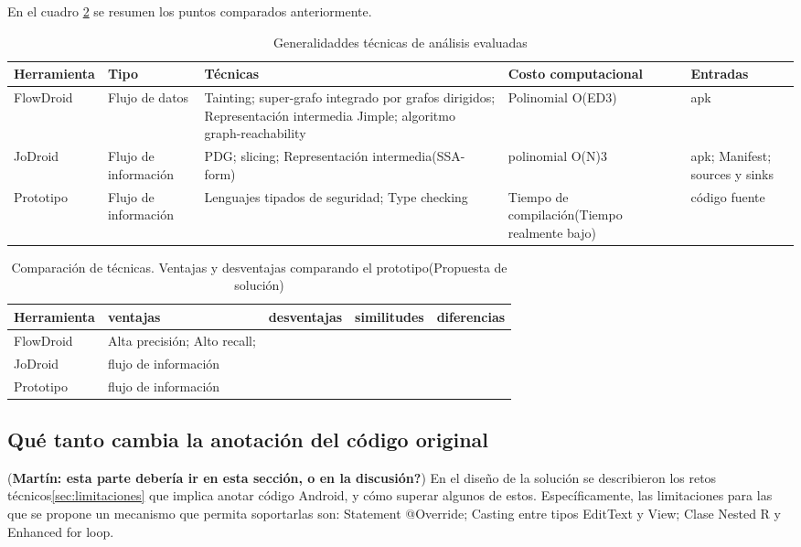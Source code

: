 En el cuadro \ref{tab:comparacion} se resumen los puntos comparados
anteriormente.
\begin{table}[H]
\begin{center}
\small\addtolength{\tabcolsep}{-3pt}
\begin{tabular}{|p{}|p{}|p{5cm}|p{2cm}|p{2cm}|}
	\hline
	\textbf{Herramienta} & \textbf{Tipo} & \textbf{Técnicas} & \textbf{Costo
	computacional} & \textbf{ Entradas} \\
	\hline
	FlowDroid & Flujo de datos & 
	Tainting; super-grafo integrado por grafos dirigidos; Representación intermedia
	Jimple; algoritmo graph-reachability & Polinomial
	O(ED3)\cite{Graph-reachability} & apk\\
	\hline
	JoDroid & Flujo de información & PDG; slicing; Representación intermedia(SSA-
	form) & polinomial O(N)3\cite{FCO-PDG} & apk; Manifest; sources y sinks
	\\
	\hline
	Prototipo & Flujo de información  & Lenguajes tipados de seguridad; Type
	checking & Tiempo de compilación(Tiempo realmente bajo) & código fuente
	\\
	\hline
\end{tabular}
\end{center}
\caption{Generalidaddes técnicas de análisis evaluadas}
\label{tab:comparacion}
\end{table}	


\begin{table}[H]
\begin{center}
\small\addtolength{\tabcolsep}{-3pt}
\begin{tabular}{|p{}|p{2cm}|p{4cm}|p{}|p{}|}
	\hline
	\textbf{Herramienta} & \textbf{ventajas } & \textbf{desventajas} 
	& \textbf{similitudes} & \textbf{diferencias}\\
	\hline
	FlowDroid 
	& Alta precisión; Alto recall;  &
	 & & \\
	\hline
	JoDroid & flujo de información & & & \\ 
	\hline
	Prototipo & flujo de información  & & & \\ 
	\hline
\end{tabular}
\end{center}
\caption{Comparación de técnicas.\newline
Ventajas y desventajas comparando el prototipo(Propuesta de solución)}
\label{tab:comparacion}
\end{table}	


\subsection{Qué tanto cambia la anotación del código original}
(\textbf{Martín: esta parte debería ir en esta sección, o en la
discusión?})\newline 
En el diseño de la solución se describieron los retos
técnicos\ref{sec:limitaciones} que implica anotar código Android, y cómo superar
algunos de estos. Específicamente, las limitaciones para las que se propone un
mecanismo que permita soportarlas son: Statement @Override; Casting entre tipos
EditText y View; Clase Nested R y Enhanced for loop.

